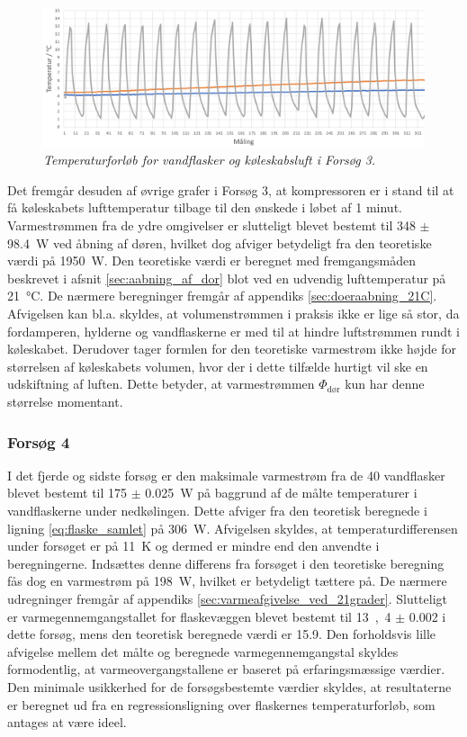 \documentclass[../Hovedrapport.tex]{subfiles}
\begin{document}
\begin{figure}[H] %
	\centering
	\includegraphics[width=1.0\textwidth]{Billeder/Temperaturforloeb.PNG}
	\caption{\textit{Temperaturforløb for vandflasker og køleskabsluft i Forsøg 3.}}
	\label{fig:temp_forsoeg3}
\end{figure}

Det fremgår desuden af øvrige grafer i Forsøg 3, at kompressoren er i stand til at få køleskabets lufttemperatur tilbage til den ønskede i løbet af 1 minut. Varmestrømmen fra de ydre omgivelser er slutteligt blevet bestemt til \si{348} $\pm$ \SI{98,4}{W} ved åbning af døren, hvilket dog afviger betydeligt fra den teoretiske værdi på \SI{1950}{W}. Den teoretiske værdi er beregnet med fremgangsmåden beskrevet i afsnit \ref{sec:aabning_af_dor} blot ved en udvendig lufttemperatur på \SI{21}{\celsius}. De nærmere beregninger fremgår af appendiks \ref{sec:doeraabning_21C}. Afvigelsen kan bl.a. skyldes, at volumenstrømmen i praksis ikke er lige så stor, da fordamperen, hylderne og vandflaskerne er med til at hindre luftstrømmen rundt i køleskabet. Derudover tager formlen for den teoretiske varmestrøm ikke højde for størrelsen af køleskabets volumen, hvor der i dette tilfælde hurtigt vil ske en udskiftning af luften. Dette betyder, at varmestrømmen $\Phi_{\text{dør}}$ kun har denne størrelse momentant.

\subsubsection*{Forsøg 4}
I det fjerde og sidste forsøg er den maksimale varmestrøm fra de 40 vandflasker blevet bestemt til \si{175} $\pm$ \SI{0,025}{W} på baggrund af de målte temperaturer i vandflaskerne under nedkølingen. Dette afviger fra den teoretisk beregnede i ligning \ref{eq:flaske_samlet} på \SI{306}{W}. Afvigelsen skyldes, at temperaturdifferensen under forsøget er på \SI{11}{K} og dermed er mindre end den anvendte i beregningerne. Indsættes denne differens fra forsøget i den teoretiske beregning fås dog en varmestrøm på \SI{198}{W}, hvilket er betydeligt tættere på. De nærmere udregninger fremgår af appendiks \ref{sec:varmeafgivelse_ved_21grader}. Slutteligt er varmegennemgangstallet for flaskevæggen blevet bestemt til \si{13,4} $\pm$ \SI{0,002}{} i dette forsøg, mens den teoretisk beregnede værdi er \SI{15,9}{}. Den forholdsvis lille afvigelse mellem det målte og beregnede varmegennemgangstal skyldes formodentlig, at varmeovergangstallene er baseret på erfaringsmæssige værdier. Den minimale usikkerhed for de forsøgsbestemte værdier skyldes, at resultaterne er beregnet ud fra en regressionsligning over flaskernes temperaturforløb, som antages at være ideel. 
\end{document}
